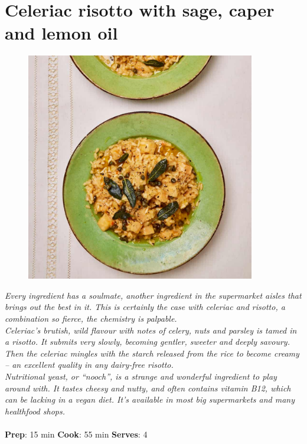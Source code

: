 \documentclass{book}
\begin{document}
\section{Celeriac risotto with sage, caper and lemon oil}
\begin{figure}
\centering\includegraphics[width=10cm,height=10cm,keepaspectratio]{Recipe_Pictures/Celeriac_risotto_with_sage,_caper_and_lemon_oil.png}
\end{figure}
\emph{Every ingredient has a soulmate, another ingredient in the supermarket aisles that brings out the best in it. This is certainly the case with celeriac and risotto, a combination so fierce, the chemistry is palpable.\\ 
Celeriac’s brutish, wild flavour with notes of celery, nuts and parsley is tamed in a risotto. It submits very slowly, becoming gentler, sweeter and deeply savoury. Then the celeriac mingles with the starch released from the rice to become creamy – an excellent quality in any dairy-free risotto.\\ 
Nutritional yeast, or “nooch”, is a strange and wonderful ingredient to play around with. It tastes cheesy and nutty, and often contains vitamin B12, which can be lacking in a vegan diet. It’s available in most big supermarkets and many healthfood shops.}\\\\ 
\textbf{Prep}: 15 min
\textbf{Cook}: 55 min
\textbf{Serves}: 4
\end{document}
